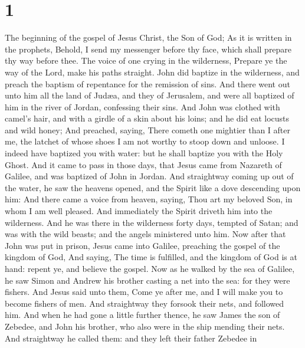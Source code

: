 \hypertarget{section}{%
\section{1}\label{section}}

 The beginning of the gospel of Jesus Christ, the Son of
God;  As it is written in the prophets, Behold, I send my
messenger before thy face, which shall prepare thy way before thee.
 The voice of one crying in the wilderness, Prepare ye the
way of the Lord, make his paths straight.  John did baptize
in the wilderness, and preach the baptism of repentance for the
remission of sins.  And there went out unto him all the land
of Judæa, and they of Jerusalem, and were all baptized of him in the
river of Jordan, confessing their sins.  And John was
clothed with camel's hair, and with a girdle of a skin about his loins;
and he did eat locusts and wild honey;  And preached,
saying, There cometh one mightier than I after me, the latchet of whose
shoes I am not worthy to stoop down and unloose.  I indeed
have baptized you with water: but he shall baptize you with the Holy
Ghost.  And it came to pass in those days, that Jesus came
from Nazareth of Galilee, and was baptized of John in Jordan.
 And straightway coming up out of the water, he saw the
heavens opened, and the Spirit like a dove descending upon him:
 And there came a voice from heaven, saying, Thou art my
beloved Son, in whom I am well pleased.  And immediately
the Spirit driveth him into the wilderness.  And he was
there in the wilderness forty days, tempted of Satan; and was with the
wild beasts; and the angels ministered unto him.  Now after
that John was put in prison, Jesus came into Galilee, preaching the
gospel of the kingdom of God,  And saying, The time is
fulfilled, and the kingdom of God is at hand: repent ye, and believe the
gospel.  Now as he walked by the sea of Galilee, he saw
Simon and Andrew his brother casting a net into the sea: for they were
fishers.  And Jesus said unto them, Come ye after me, and I
will make you to become fishers of men.  And straightway
they forsook their nets, and followed him.  And when he had
gone a little further thence, he saw James the son of Zebedee, and John
his brother, who also were in the ship mending their nets. 
And straightway he called them: and they left their father Zebedee in

